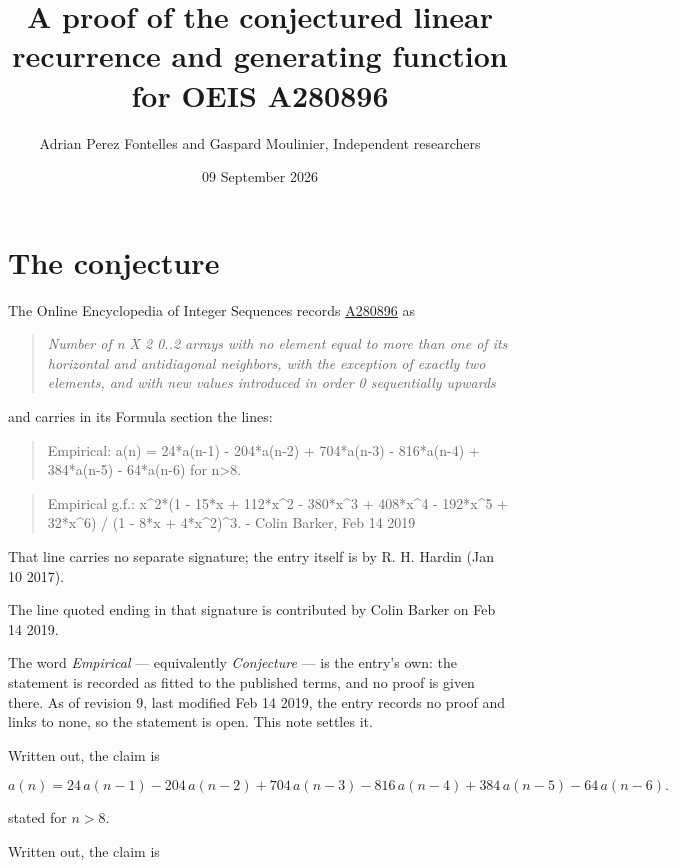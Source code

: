 \documentclass[11pt]{article}
\title{A proof of the conjectured linear recurrence and generating function for OEIS A280896}
\author{Adrian Perez Fontelles and Gaspard Moulinier, Independent researchers}
\date{09 September 2026}
\theoremstyle{definition}
\begin{document}
\maketitle
\section{The conjecture}

The Online Encyclopedia of Integer Sequences records \href{https://oeis.org/A280896}{A280896} as

\begin{quote}\itshape Number of n X 2 0..2 arrays with no element equal to more than one of its horizontal and antidiagonal neighbors, with the exception of exactly two elements, and with new values introduced in order 0 sequentially upwards\end{quote}

and carries in its Formula section the lines:

\begin{quote}\ttfamily Empirical: a(n) = 24*a(n-1) - 204*a(n-2) + 704*a(n-3) - 816*a(n-4) + 384*a(n-5) - 64*a(n-6) for n>8.\end{quote}

\begin{quote}\ttfamily Empirical g.f.: x\textasciicircum{}2*(1 - 15*x + 112*x\textasciicircum{}2 - 380*x\textasciicircum{}3 + 408*x\textasciicircum{}4 - 192*x\textasciicircum{}5 + 32*x\textasciicircum{}6) / (1 - 8*x + 4*x\textasciicircum{}2)\textasciicircum{}3. - Colin Barker, Feb 14 2019\end{quote}

That line carries no separate signature; the entry itself is by R. H. Hardin (Jan 10 2017).

The line quoted ending in that signature is contributed by Colin Barker on Feb 14 2019.

The word {\itshape Empirical} --- equivalently {\itshape Conjecture} --- is the entry's own: the statement is recorded as fitted to the published terms, and no proof is given there. As of revision 9, last modified Feb 14 2019, the entry records no proof and links to none, so the statement is open. This note settles it.

Written out, the claim is

\[a(n) = 24\,a(n-1) - 204\,a(n-2) + 704\,a(n-3) - 816\,a(n-4) + 384\,a(n-5) - 64\,a(n-6).\]

stated for $n > 8$.

Written out, the claim is
\end{document}
